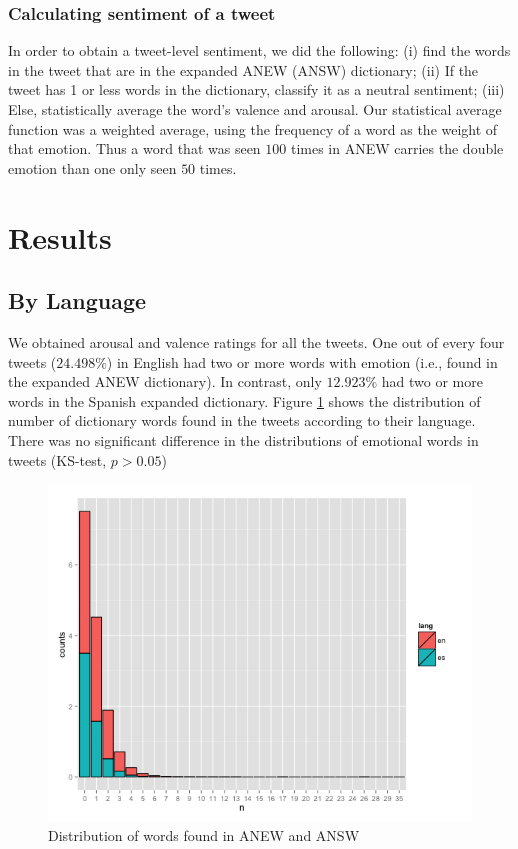 \documentclass[11pt]{article}
\begin{document}

\subsubsection{Calculating sentiment of a tweet}
In order to obtain a tweet-level sentiment, we did the following: (i) find the words in the tweet that are in the expanded ANEW (ANSW) dictionary; (ii) If the tweet has 1 or less words in the dictionary, classify it as a neutral sentiment; (iii) Else, statistically average the word's valence and arousal. Our statistical average function was a weighted average, using the frequency of a word as the weight of that emotion. Thus a word that was seen $100$ times in ANEW carries the double emotion than one only seen $50$ times. 

\section{Results}
\subsection{By Language}
We obtained arousal and valence ratings for all the tweets. One out of every four tweets ($24.498\%$) in English had two or more words with emotion (i.e., found in the expanded ANEW dictionary). In contrast, only $12.923\%$ had two or more words in the Spanish expanded dictionary. Figure \ref{fig:distrEmolang} shows the distribution of number of dictionary words found in the tweets according to their language. There was no significant difference in the distributions of emotional words in tweets (KS-test, $p > 0.05$)

\begin{figure}[tb]
	\centering
	\includegraphics[scale=.6]{distr_Emotion_lang}
	\caption{Distribution of words found in ANEW and ANSW}
	\label{fig:distrEmolang}
\end{figure}
\end{document}
